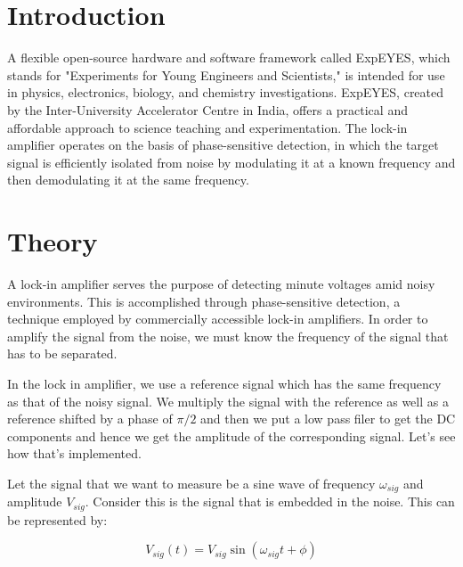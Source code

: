 \documentclass{article}
\begin{document}
\begin{multicols}{2}



\section{Introduction}

A flexible open-source hardware and software framework called ExpEYES, which stands for "Experiments for Young Engineers and Scientists," is intended for use in physics, electronics, biology, and chemistry investigations. ExpEYES, created by the Inter-University Accelerator Centre in India, offers a practical and affordable approach to science teaching and experimentation. The lock-in amplifier operates on the basis of phase-sensitive detection, in which the target signal is efficiently isolated from noise by modulating it at a known frequency and then demodulating it at the same frequency. 


\section{\label{theory}Theory}


A lock-in amplifier serves the purpose of detecting minute voltages amid noisy environments. This is accomplished through phase-sensitive detection, a technique employed by commercially accessible lock-in amplifiers. In order to amplify the signal from the noise, we must know the frequency of the signal that has to be separated. 


In the lock in amplifier, we use a reference signal which has the same frequency as that of the noisy signal. We multiply the signal with the reference as well as a reference shifted by a phase of $\pi/2$ and then we put a low pass filer to get the DC components and hence we get the amplitude of the corresponding signal. Let's see how that's implemented.



Let the signal that we want to measure be a sine wave of frequency $\omega_{sig}$ and amplitude $V_{sig}$. Consider this is the signal that is embedded in the noise. This can be represented by:


\begin{equation}
    V_{sig}(t) = V_{sig} \sin(\omega_{sig}t + \phi)
\end{equation}


\end{multicols}
\end{document}
